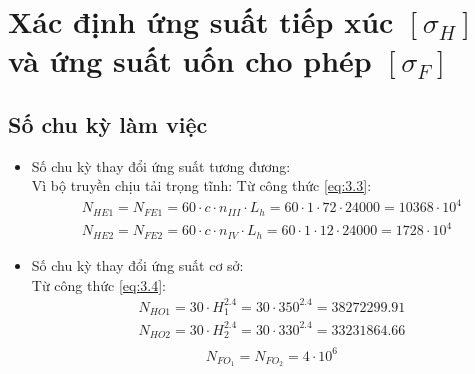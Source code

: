         \section{Xác định ứng suất tiếp xúc  $[\sigma_H]$ và ứng suất uốn cho phép $[\sigma_F]$}
            \subsection{Số chu kỳ làm việc}
                \begin{itemize}
                    \item Số chu kỳ thay đổi ứng suất tương đương: \\[0.2cm]
                        Vì bộ truyền chịu tải trọng tĩnh:
                        Từ công thức \ref{eq:3.3}:
                        \begin{align*}
                            N_{HE1} = N_{FE1} = 60 \cdot c \cdot n_{III} \cdot L_h = 60 \cdot 1 \cdot 72 \cdot 24000 = 10368 \cdot 10^4 \\
                            N_{HE2} = N_{FE2} = 60 \cdot c \cdot n_{IV} \cdot L_h = 60 \cdot 1 \cdot 12 \cdot 24000 = 1728 \cdot 10^4
                        \end{align*}    
                    \item Số chu kỳ thay đổi ứng suất cơ sở: \\[0.2cm]
                        Từ công thức \ref{eq:3.4}:
                        \begin{align*}
                            N_{HO1} = 30 \cdot H_{1}^{2.4} = 30 \cdot 350^{2.4} = 38272299.91 \\
                            N_{HO2} = 30 \cdot H_{2}^{2.4} = 30 \cdot 330^{2.4} = 33231864.66 \\
                        \end{align*}
                        \begin{equation*}
                            N_{FO_1} = N_{FO_2} = 4 \cdot 10^6
                        \end{equation*}
                \end{itemize}
